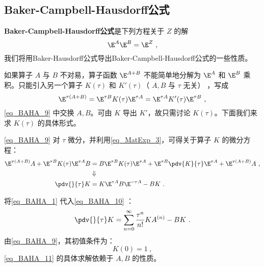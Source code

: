 \subsection{Baker-Campbell-Hausdorff公式}
\textbf{Baker-Campbell-Hausdorff公式}是下列方程关于 $Z$ 的解
\begin{equation}
\E^{A}\E^{B}=\E^{Z}~,
\end{equation}
我们将用Baker-Hausdorff公式导出Baker-Campbell-Hausdorff公式的一些性质。

如果算子 $A$ 与 $B$ 不对易，算子函数 $\E^{A+B}$ 不能简单地分解为  $\E^{A}$ 和 $\E^{B}$ 乘积。只能引入另一个算子 $K(\tau)$ 和 $K'(\tau)$（ $A,B$ 与 $\tau$ 无关） ，写成
\begin{equation}\label{eq_BAHA_9}
\E^{\tau(A+B)}=\E^{\tau B}K(\tau)\E^{\tau A}=\E^{\tau A}K'(\tau)\E^{\tau B}~,
\end{equation}
\autoref{eq_BAHA_9} 中交换 $A,B$。可由 $K$ 导出 $K'$，故只需讨论 $K(\tau)$。下面我们来求 $K(\tau)$ 的具体形式。

\autoref{eq_BAHA_9} 对 $\tau$ 微分，并利用\autoref{eq_MatExp_3}，可得关于算子 $K$ 的微分方程：
\begin{equation}\label{eq_BAHA_10}
\begin{aligned}
\E^{\tau(A+B)}A+\E^{\tau B}K(\tau)\E^{\tau A}B&=B\E^{\tau B}K(\tau)\E^{\tau A}+\E^{\tau B}\pdv{K}{\tau}\E^{\tau A}+\E^{\tau(A+B)}A~,\\
&\Downarrow\\
\pdv{}{\tau}K&=K\E^{\tau A}B\E^{-\tau A}-BK~.
\end{aligned}
\end{equation}

将\autoref{eq_BAHA_1} 代入\autoref{eq_BAHA_10} ：
\begin{equation}\label{eq_BAHA_11}
\pdv{}{\tau}K=\sum_{n=0}^{\infty}\frac{\tau^n}{n!}KA^{(n)}-BK~.
\end{equation}
由\autoref{eq_BAHA_9}，其初值条件为：
\begin{equation}
K(0)=1~,
\end{equation}
\autoref{eq_BAHA_11} 的具体求解依赖于 $A,B$ 的性质。

